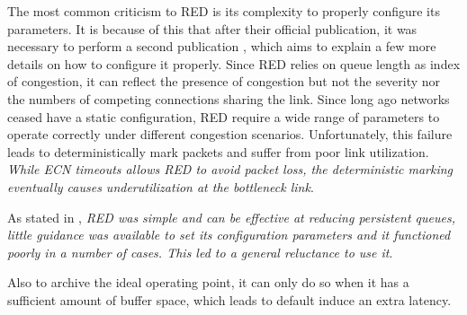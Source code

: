 The most common criticism to RED is its complexity to properly configure its
parameters. It is because of this that after their official publication, it
was necessary to perform a second publication \cite{NotesRED}, which aims to
explain a few more details on how to configure it properly. Since RED relies on
queue length as index of congestion, it can reflect the presence of congestion
but not the severity nor the numbers of competing connections sharing the
link. Since long ago networks ceased have a static configuration, RED require
a wide range of parameters to operate correctly under different congestion
scenarios. Unfortunately, this failure leads to deterministically mark packets
and suffer from poor link utilization. \textit{While  ECN timeouts allows RED
to avoid packet loss, the deterministic marking eventually causes
underutilization at the bottleneck link}\cite{FengBLUEAQM}.

As stated in \cite{NicholsJacobsonCQD}, \textit{RED was simple and can be
effective at reducing persistent queues, little guidance was available to set
its configuration parameters and it functioned poorly in a number of cases.
This led to a general reluctance to use it}.

Also to archive the ideal operating point, it can only do so when it has a
sufficient amount of buffer space, which leads to default induce an extra
latency.
